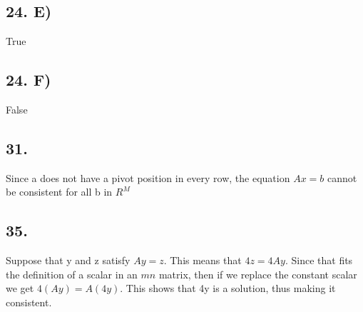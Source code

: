 \documentclass[12]{scrartcl}
\begin{document}
\subsection*{24. E)}
True
\subsection*{24. F)}
False
\subsection*{31. }
Since a does not have a pivot position in every row, the equation  $Ax = b$ cannot be consistent for all b in $R^M$
\subsection*{35.}
Suppose that y and z satisfy  $Ay = z$. This means that $4z = 4Ay$. Since that fits the definition of a scalar in an $mn$ matrix, then if we replace the constant scalar we get $4(Ay) = A(4y)$. This shows that 4y is a solution, thus making it consistent. 
\end{document}
